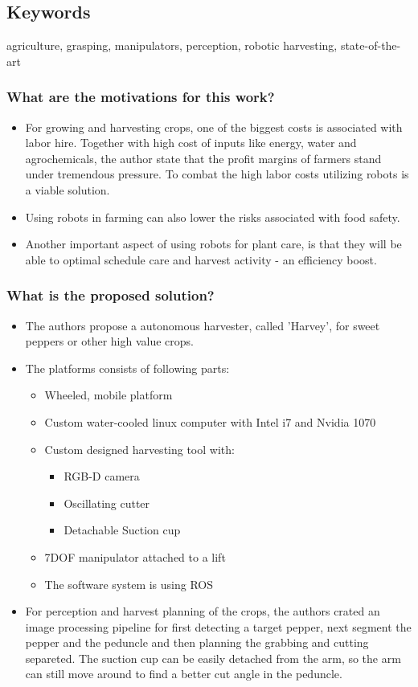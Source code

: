    \subsection*{Keywords}
    agriculture, grasping, manipulators, perception, robotic harvesting, state-of-the-art
    
    
     
    \subsubsection*{What are the motivations for this work?}
    \begin{itemize}
        \item For growing and harvesting crops, one of the biggest costs is associated with labor hire. Together with high cost of inputs like energy, water and agrochemicals, the author state that the profit margins of farmers stand under tremendous pressure. To combat the high labor costs utilizing robots is a viable solution.
        \item Using robots in farming can also lower the risks associated with food safety.
        \item Another important aspect of using robots for plant care, is that they will be able to optimal schedule care and harvest activity - an efficiency boost.
    \end{itemize}
    \subsubsection*{What is the proposed solution?}
    \begin{itemize}
        \item The authors propose a autonomous harvester, called 'Harvey', for sweet peppers or other high value crops.
        \item The platforms consists of following parts: \ \begin{itemize}
            \item Wheeled, mobile platform
            \item Custom water-cooled linux computer with Intel i7 and Nvidia 1070
            \item Custom designed harvesting tool with: \ \begin{itemize}
                \item RGB-D camera
                \item Oscillating cutter
                \item Detachable Suction cup
            \end{itemize}
            \item 7DOF manipulator attached to a lift
            \item The software system is using ROS 
        \end{itemize} 
        \item For perception and harvest planning of the crops, the authors crated an image processing pipeline for first detecting a target pepper, next segment the pepper and the peduncle and then planning the grabbing and cutting separeted. The suction cup can be easily detached from the arm, so the arm can still move around to find a better cut angle in the peduncle.
    \end{itemize}
